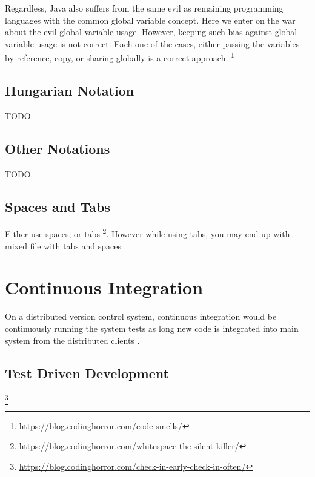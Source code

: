     Regardless, Java also suffers from the same evil as remaining programming
    languages with the common global variable concept. Here we enter on the
    war about the evil global variable usage. However, keeping such bias against
    global variable usage is not correct. Each one of the cases, either passing
    the variables by reference, copy, or sharing globally is a correct approach.
    \footnote{\url{https://blog.codinghorror.com/code-smells/}}


    \subsection{Hungarian Notation}

    TODO.


    \subsection{Other Notations}

    TODO.


    \subsection{Spaces and Tabs}

    Either use spaces, or tabs
    \footnote{\url{https://blog.codinghorror.com/whitespace-the-silent-killer/}}.
    However while using tabs,
    you may end up with mixed file with tabs and spaces \cite{tabsAndSpacesConversion}.



    \section{Continuous Integration}

    On a distributed version control system,
    continuous integration would be continuously running the system tests
    as long new code is integrated into main system
    from the distributed clients \cite{continuousIntegration}.


    \subsection{Test Driven Development}


    \footnote{\url{https://blog.codinghorror.com/check-in-early-check-in-often/}}

    \cite{aspectOriented}


